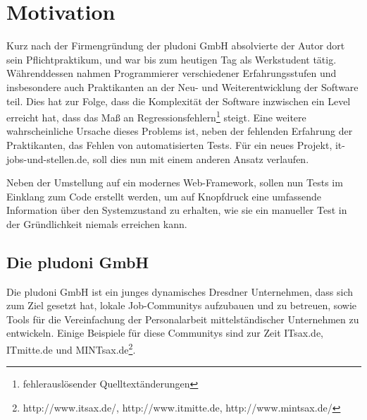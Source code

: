 \section{Motivation}

Kurz nach der Firmengründung der pludoni GmbH absolvierte der Autor dort sein Pflichtpraktikum, und war bis zum heutigen Tag als Werkstudent tätig.
Währenddessen nahmen Programmierer verschiedener Erfahrungsstufen und insbesondere auch Praktikanten an der Neu- und Weiterentwicklung der Software teil. Dies hat zur Folge, dass die Komplexität der Software inzwischen ein Level erreicht hat, dass das Maß an Regressionsfehlern\footnote{fehlerauslösender Quelltextänderungen} steigt. Eine weitere wahrscheinliche Ursache dieses Problems ist, neben der fehlenden Erfahrung der Praktikanten, das Fehlen von automatisierten Tests.
Für ein neues Projekt, it-jobs-und-stellen.de, soll dies nun mit einem anderen Ansatz verlaufen. 

Neben der Umstellung auf ein modernes Web-Framework, sollen nun Tests im Einklang zum Code erstellt werden, um auf Knopfdruck eine umfassende Information über den Systemzustand zu erhalten, wie sie ein manueller Test in der Gründlichkeit niemals erreichen kann.

\subsection{Die pludoni GmbH}

Die pludoni GmbH ist ein junges dynamisches Dresdner Unternehmen, dass sich zum Ziel gesetzt hat, lokale Job-Communitys aufzubauen und zu betreuen, sowie Tools für die Vereinfachung der Personalarbeit mittelständischer Unternehmen zu entwickeln. Einige Beispiele für diese Communitys sind zur Zeit ITsax.de, ITmitte.de und MINTsax.de\footnote{http://www.itsax.de/, http://www.itmitte.de, http://www.mintsax.de/}.
